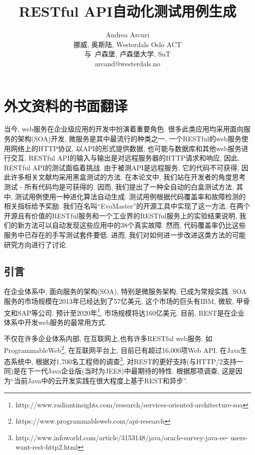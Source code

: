 \chapter{外文资料的书面翻译}

\title{RESTful API自动化测试用例生成}

\author{Andrea Arcuri\\挪威, 奥斯陆, Westerdals Oslo ACT\\与\ 卢森堡, 卢森堡大学, SnT\\ arcand@westerdals.no}

\begin{cabstract}
当今, web服务在企业级应用的开发中扮演着重要角色. 很多此类应用均采用面向服务的架构(SOA)开发, 微服务是其中最流行的种类之一. 一个RESTful的web服务使用网络上的HTTP协议, 以API的形式提供数据, 也可能与数据库和其他web服务进行交互. RESTful API的输入与输出是对远程服务器的HTTP请求和响应, 因此, RESTful API的测试面临着挑战. 由于被测API是远程服务, 它的代码不可获得, 因此许多相关文献均采用黑盒测试的方法. 在本论文中, 我们站在开发者的角度思考测试 - 所有代码均是可获得的. 因而, 我们提出了一种全自动的白盒测试方法, 其中, 测试用例使用一种进化算法自动生成. 测试用例根据代码覆盖率和故障检测的相关指标给予奖励. 我们在名叫“EvoMaster”的开源工具中实现了这一方法. 在两个开源且有价值的RESTful服务和一个工业界的RESTful服务上的实验结果说明, 我们的新方法可以自动发现这些应用中的38个真实故障. 然而, 代码覆盖率仍比这些服务中已存在的手写测试套件要低. 进而, 我们对如何进一步改进这类方法的可能研究方向进行了讨论.
\end{cabstract}



\section{引言}
在企业体系中, 面向服务的架构(SOA), 特别是微服务架构\cite{newman2015building}, 已成为常规实践. SOA服务的市场规模在2013年已经达到了57亿美元, 这个市场的巨头有IBM, 微软, 甲骨文和SAP等公司. 预计至2020年\footnote{http://www.radiantinsights.com/research/services-oriented-architecture-soa}, 市场规模将达160亿美元. 目前, REST\cite{fielding2000architectural}是在企业体系中开发web服务的最常用方式. 

不仅在许多企业体系内部, 在互联网上,也有许多RESTful web服务. 如ProgrammableWeb\footnote{https://www.programmableweb.com/api-research}, 在互联网平台上, 目前已有超过16,000项Web API. 在Java生态系统中, 根据对1,700名工程师的调查\footnote{http://www.infoworld.com/article/3153148/java/oracle-survey-java-ee-
users-want-rest-http2.html}, 对REST的更好支持(与HTTP/2支持一同)是在下一代Java企业版(当时为JEE8)中最期待的特性. 根据那项调查, 这是因为“当前Java中的云开发实践在很大程度上基于REST和异步”. 

